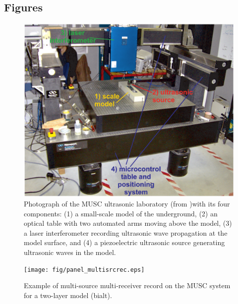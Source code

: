 \documentclass[manuscript,revised]{geophysics}
\begin{document}
\subsection*{Figures}

\begin{figure}[!h]
	\centering
	\includegraphics[scale=0.5]{fig/panel_musc_bench.eps}
	\caption{Photograph of the MUSC ultrasonic laboratory (from \citet{Bretaudeau_FWI_2013} )with its four components: (1) a small-scale model of the underground, (2) an optical table with two automated arms moving above the model, (3) a laser interferometer recording ultrasonic wave propagation	at the model surface, and (4) a piezoelectric ultrasonic source generating ultrasonic waves in the model.}
	\label{panel_musc_bench}
\end{figure}

\begin{figure}[!h]
	\centering
	\texttt{[image: fig/panel\_multisrcrec.eps]}
	\caption{Example of multi-source multi-receiver record on the MUSC system for a two-layer model (bialt).}
	\label{panel_multisrcrec}
\end{figure}
\end{document}
